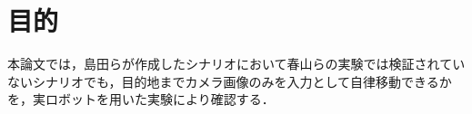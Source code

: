 \section{目的}
本論文では，島田らが作成したシナリオにおいて春山らの実験では検証されていないシナリオでも，目的地までカメラ画像のみを入力として自律移動できるかを，実ロボットを用いた実験により確認する．
